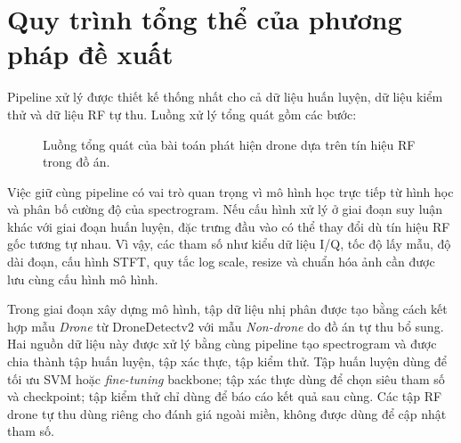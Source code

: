 \documentclass[../DoAn.tex]{subfiles}
\begin{document}
\section{Quy trình tổng thể của phương pháp đề xuất}

Pipeline xử lý được thiết kế thống nhất cho cả dữ liệu huấn luyện, dữ liệu kiểm thử và dữ liệu RF tự thu. Luồng xử lý tổng quát gồm các bước:

\begin{figure}[htbp]
    \centering
    \caption{Luồng tổng quát của bài toán phát hiện drone dựa trên tín hiệu RF trong đồ án.}
    \label{fig:overall-problem}
\end{figure}
\FloatBarrier


Việc giữ cùng pipeline có vai trò quan trọng vì mô hình học trực tiếp từ hình học và phân bố cường độ của spectrogram. Nếu cấu hình xử lý ở giai đoạn suy luận khác với giai đoạn huấn luyện, đặc trưng đầu vào có thể thay đổi dù tín hiệu RF gốc tương tự nhau. Vì vậy, các tham số như kiểu dữ liệu I/Q, tốc độ lấy mẫu, độ dài đoạn, cấu hình STFT, quy tắc log scale, resize và chuẩn hóa ảnh cần được lưu cùng cấu hình mô hình.

Trong giai đoạn xây dựng mô hình, tập dữ liệu nhị phân được tạo bằng cách kết hợp mẫu \textit{Drone} từ DroneDetectv2 với mẫu \textit{Non-drone} do đồ án tự thu bổ sung. Hai nguồn dữ liệu này được xử lý bằng cùng pipeline tạo spectrogram và được chia thành tập huấn luyện, tập xác thực, tập kiểm thử. Tập huấn luyện dùng để tối ưu SVM hoặc \textit{fine-tuning} backbone; tập xác thực dùng để chọn siêu tham số và checkpoint; tập kiểm thử chỉ dùng để báo cáo kết quả sau cùng. Các tập RF drone tự thu dùng riêng cho đánh giá ngoài miền, không được dùng để cập nhật tham số.
\end{document}
